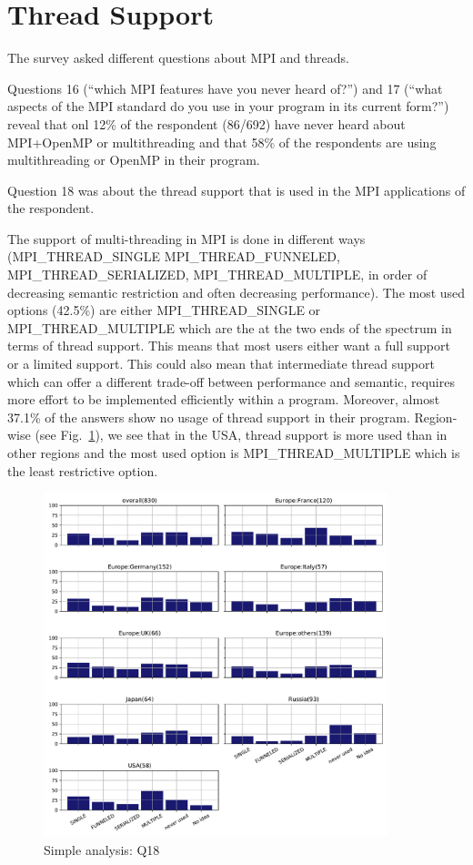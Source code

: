\section{Thread Support}

The survey asked different questions about MPI and threads.


Questions 16 (``which MPI features have you never heard of?'') and 17 (``what
aspects of the MPI standard do you use in your program in its current form?'')
reveal that onl 12\% of the respondent (86/692) have never heard about
MPI+OpenMP or multithreading and that 58\% of the respondents are using
multithreading or OpenMP in their program.


Question 18 was about the thread support that is used in the MPI applications
of the respondent.  



The support of multi-threading in MPI is done in different ways (MPI\_THREAD\_SINGLE
MPI\_THREAD\_FUNNELED, MPI\_THREAD\_SERIALIZED, MPI\_THREAD\_MULTIPLE, in order of
decreasing semantic restriction and often decreasing performance). The most used options (42.5\%) are either
MPI\_THREAD\_SINGLE or MPI\_THREAD\_MULTIPLE which are the at the two ends of the
spectrum in terms of thread support. This means that  most users either want a full support or a
limited support. This could also mean that intermediate thread support which can
offer a different trade-off between performance and semantic, requires more effort to be
implemented efficiently within a program. Moreover, almost 37.1\% of the answers
show no usage of thread
support in their program. Region-wise (see Fig.~\ref{fig:Q18}), we see that in the USA, thread support is more used
than in other regions and the most used option is MPI\_THREAD\_MULTIPLE which is
the least restrictive option. 

\begin{figure}[htb]
\begin{center}
\includegraphics[width=10cm]{../pdfs/Q18.pdf}
\caption{Simple analysis: Q18}
\label{fig:Q18}
\end{center}
\end{figure}


